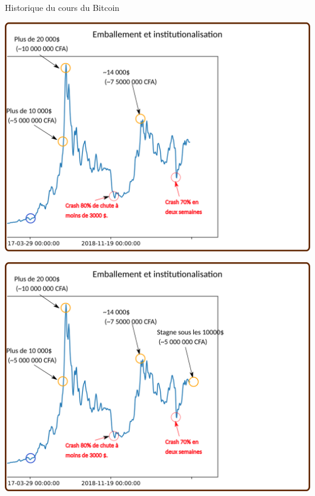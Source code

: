 \documentclass[presentation]{beamer}
\begin{document}
\begin{frame}[label={sec:org6ff9387}]{Historique du cours du Bitcoin}
\begin{block}{}
\begin{center}
\includegraphics[width=.95\textwidth]{./Pictures/Timeline/44emballement_crash4.png}
\end{center}
\end{block}

\begin{block}{}
\begin{center}
\includegraphics[width=.95\textwidth]{./Pictures/Timeline/45emballement_aujourdhui.png}
\end{center}
\end{block}


\end{frame}
\end{document}
